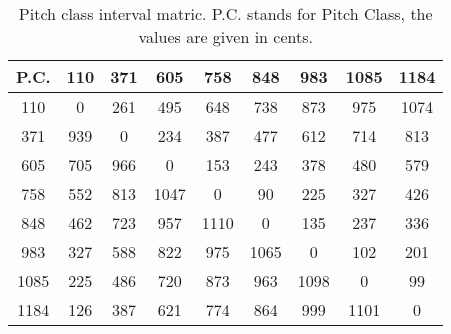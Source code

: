 \begin{table}
\begin{tabular}{c||  c  c  c  c  c  c  c  c  }	
P.C. & 110 & 371 & 605 & 758 & 848 & 983 & 1085 & 1184 \\
\hline
\hline
110 & 0 & 261 & 495 & 648 & 738 & 873 & 975 & 1074\\
371 & 939 & 0 & 234 & 387 & 477 & 612 & 714 & 813\\
605 & 705 & 966 & 0 & 153 & 243 & 378 & 480 & 579\\
758 & 552 & 813 & 1047 & 0 & 90 & 225 & 327 & 426\\
848 & 462 & 723 & 957 & 1110 & 0 & 135 & 237 & 336\\
983 & 327 & 588 & 822 & 975 & 1065 & 0 & 102 & 201\\
1085 & 225 & 486 & 720 & 873 & 963 & 1098 & 0 & 99\\
1184 & 126 & 387 & 621 & 774 & 864 & 999 & 1101 & 0     	
\end{tabular}
\label{tbl:pitch_class_interval_matrix}
\caption{Pitch class interval matric. P.C. stands for Pitch Class, the values are given in cents.}
\end{table}
